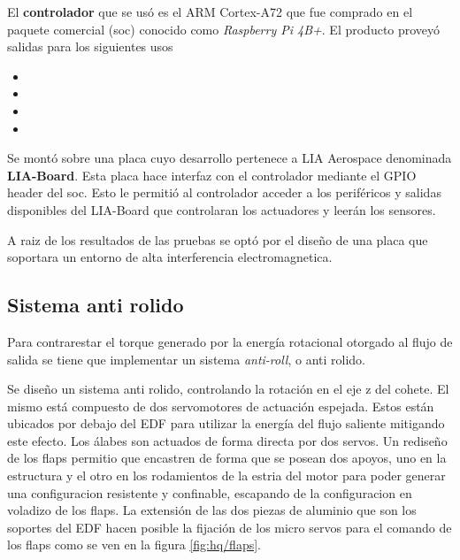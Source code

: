 \medskip

El \textbf{controlador} que se usó es el ARM Cortex-A72 que fue comprado en el paquete comercial (\gls{soc}) conocido como \textit{Raspberry Pi 4B+}. El producto proveyó salidas para los siguientes usos

\begin{itemize}
    \item {}
    \item {}
    \item {}
    \item {}
\end{itemize}

Se montó sobre una placa cuyo desarrollo pertenece a LIA Aerospace denominada \textbf{LIA-Board}. Esta placa hace interfaz con el controlador mediante el GPIO header del \gls{soc}. Esto le permitió al controlador acceder a los periféricos y salidas disponibles del LIA-Board que controlaran los actuadores y leerán los sensores.

\medskip


A raiz de los resultados de las pruebas se optó por el diseño de una placa que soportara
un entorno de alta interferencia electromagnetica. 


\subsection{Sistema anti rolido}

Para contrarestar el torque generado por la energía rotacional otorgado al flujo de salida se tiene que implementar un sistema \textit{anti-roll}, o anti rolido.

\medskip

Se diseño un sistema anti rolido, controlando la rotación en el eje z del cohete. El mismo está compuesto de dos servomotores de actuación espejada. Estos están ubicados por debajo del EDF para utilizar la energía del flujo saliente mitigando este efecto. Los álabes son actuados de forma directa por dos servos. Un rediseño de los flaps permitio que encastren de forma que se posean dos
apoyos, uno en la estructura y el otro en los rodamientos de la estria del motor para poder generar una configuracion resistente y confinable, escapando de la configuracion en voladizo de los flaps. La extensión de las dos piezas de aluminio que son los
soportes del EDF hacen posible la fijación de los micro servos para el comando de los flaps como se ven en la figura \ref{fig:hq/flaps}.

